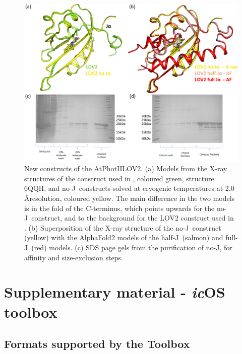 \begin{figure}[H] %
    \centering
    \noindent \includegraphics[width=\textwidth]{images/LOV2/new_constructs.pdf}
    \hfill
    \caption{New constructs of the AtPhotIILOV2. (a) Models from the X-ray structures of the construct used in \cite{aumonierSlowProteinDynamics2022}, coloured green, structure 6QQH, and no-J\textalpha\ constructs solved at cryogenic temperatures at 2.0 \AA resolution, coloured yellow. The main difference in the two models is in the fold of the C-terminus, which points upwards for the no-J\textalpha\ construct, and to the background for the LOV2 construct used in \cite{aumonierSlowProteinDynamics2022}. (b) Superposition of the X-ray structure of the no-J\textalpha\ construct (yellow) with the AlphaFold2 models of the half-J\textalpha\ (salmon) and full-J\textalpha\ (red) models. (c) SDS page gels from the purification of no-J\textalpha, for affinity and size-exclusion steps.}
    \label{supfig:newconstructs}
\end{figure}

\section{Supplementary material - \textit{ic}OS toolbox}

\subsection{Formats supported by the Toolbox}

